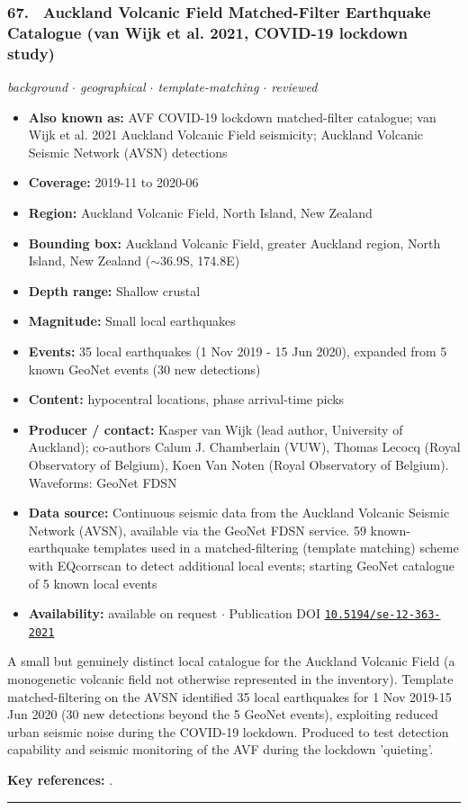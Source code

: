 \documentclass[10pt,a4paper]{article}
\newcommand{\catentryrule}{\par\vspace{3pt}\noindent\textcolor{rulegrey}{\rule{\linewidth}{0.3pt}}\par\vspace{5pt}}
\newcommand{\kv}[2]{\item \textbf{#1:} #2}
\begin{document}
\subsubsection*{\hypertarget{c:67}{67.}~ Auckland Volcanic Field Matched-Filter Earthquake Catalogue (van Wijk et al. 2021, COVID-19 lockdown study)}
{\small\itshape background $\cdot$ geographical $\cdot$ template-matching $\cdot$ reviewed}\par\vspace{2pt}
\begin{itemize}[leftmargin=1.3em,itemsep=0.6pt,topsep=1pt,parsep=0pt]
\kv{Also known as}{AVF COVID-19 lockdown matched-filter catalogue; van Wijk et al. 2021 Auckland Volcanic Field seismicity; Auckland Volcanic Seismic Network (AVSN) detections}
\kv{Coverage}{2019-11 to 2020-06}
\kv{Region}{Auckland Volcanic Field, North Island, New Zealand}
\kv{Bounding box}{Auckland Volcanic Field, greater Auckland region, North Island, New Zealand ($\sim$36.9S, 174.8E)}
\kv{Depth range}{Shallow crustal}
\kv{Magnitude}{Small local earthquakes}
\kv{Events}{35 local earthquakes (1 Nov 2019 - 15 Jun 2020), expanded from 5 known GeoNet events (30 new detections)}
\kv{Content}{hypocentral locations, phase arrival-time picks}
\kv{Producer / contact}{Kasper van Wijk (lead author, University of Auckland); co-authors Calum J. Chamberlain (VUW), Thomas Lecocq (Royal Observatory of Belgium), Koen Van Noten (Royal Observatory of Belgium). Waveforms: GeoNet FDSN}
\kv{Data source}{Continuous seismic data from the Auckland Volcanic Seismic Network (AVSN), available via the GeoNet FDSN service. 59 known-earthquake templates used in a matched-filtering (template matching) scheme with EQcorrscan to detect additional local events; starting GeoNet catalogue of 5 known local events}
\kv{Availability}{available on request $\cdot$ Publication DOI \href{https://doi.org/10.5194/se-12-363-2021}{\nolinkurl{10.5194/se-12-363-2021}}}
\end{itemize}
\par\vspace{2pt}A small but genuinely distinct local catalogue for the Auckland Volcanic Field (a monogenetic volcanic field not otherwise represented in the inventory). Template matched-filtering on the AVSN identified 35 local earthquakes for 1 Nov 2019-15 Jun 2020 (30 new detections beyond the 5 GeoNet events), exploiting reduced urban seismic noise during the COVID-19 lockdown. Produced to test detection capability and seismic monitoring of the AVF during the lockdown 'quieting'.
\par\vspace{2pt}\textbf{Key references:} \cite{vanWijk2021,vanWijk2020}.
\catentryrule
\end{document}

